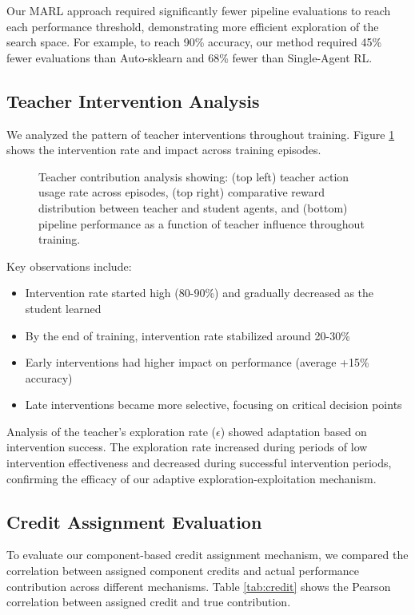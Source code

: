 \documentclass[twoside,11pt]{article}
\begin{document}
Our MARL approach required significantly fewer pipeline evaluations to reach each performance threshold, demonstrating more efficient exploration of the search space. For example, to reach 90\% accuracy, our method required 45\% fewer evaluations than Auto-sklearn and 68\% fewer than Single-Agent RL.

\subsection{Teacher Intervention Analysis}

We analyzed the pattern of teacher interventions throughout training. Figure \ref{fig:teacher_contribution} shows the intervention rate and impact across training episodes.

\begin{figure}[ht]
\centering
{}
\caption{Teacher contribution analysis showing: (top left) teacher action usage rate across episodes, (top right) comparative reward distribution between teacher and student agents, and (bottom) pipeline performance as a function of teacher influence throughout training.}
\label{fig:teacher_contribution}
\end{figure}

Key observations include:

\begin{itemize}
    \item Intervention rate started high (80-90\%) and gradually decreased as the student learned
    \item By the end of training, intervention rate stabilized around 20-30\%
    \item Early interventions had higher impact on performance (average +15\% accuracy)
    \item Late interventions became more selective, focusing on critical decision points
\end{itemize}

Analysis of the teacher's exploration rate ($\epsilon$) showed adaptation based on intervention success. The exploration rate increased during periods of low intervention effectiveness and decreased during successful intervention periods, confirming the efficacy of our adaptive exploration-exploitation mechanism.

\subsection{Credit Assignment Evaluation}
To evaluate our component-based credit assignment mechanism, we compared the correlation between assigned component credits and actual performance contribution across different mechanisms. Table \ref{tab:credit} shows the Pearson correlation between assigned credit and true contribution.
\end{document}
